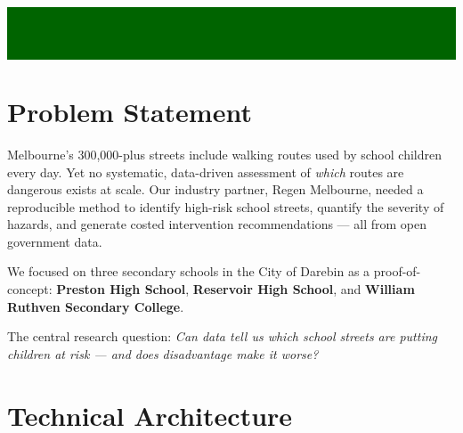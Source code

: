 \documentclass[11pt,a4paper]{article}
\begin{document}
\thispagestyle{empty}

\colorbox{darkgreen}{\parbox{\linewidth}{%
  \vspace{8pt}
  \\[3pt]
  \\[2pt]
  \\[6pt]
  \vspace{8pt}
}}

\vspace{12pt}

\section{Problem Statement}

Melbourne's 300,000-plus streets include walking routes used by school children every day. Yet no systematic, data-driven assessment of \emph{which} routes are dangerous exists at scale. Our industry partner, Regen Melbourne, needed a reproducible method to identify high-risk school streets, quantify the severity of hazards, and generate costed intervention recommendations --- all from open government data.

We focused on three secondary schools in the City of Darebin as a proof-of-concept:
\textbf{Preston High School}, \textbf{Reservoir High School}, and \textbf{William Ruthven Secondary College}.

The central research question: \emph{Can data tell us which school streets are putting children at risk --- and does disadvantage make it worse?}

\section{Technical Architecture}
\end{document}
